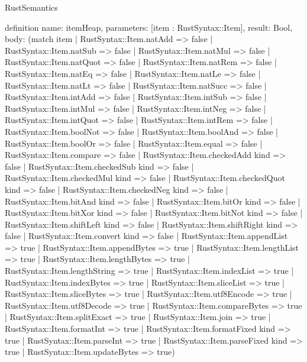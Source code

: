 \begin{lexlean}{RustSemantics}
\begin{semanticmodule}
definition{
  name: itemHeap,
  parameters: [item : RustSyntax::Item],
  result: Bool,
  body: (match item
    | RustSyntax::Item.natAdd => false
    | RustSyntax::Item.natSub => false
    | RustSyntax::Item.natMul => false
    | RustSyntax::Item.natQuot => false
    | RustSyntax::Item.natRem => false
    | RustSyntax::Item.natEq => false
    | RustSyntax::Item.natLe => false
    | RustSyntax::Item.natLt => false
    | RustSyntax::Item.natSucc => false
    | RustSyntax::Item.intAdd => false
    | RustSyntax::Item.intSub => false
    | RustSyntax::Item.intMul => false
    | RustSyntax::Item.intNeg => false
    | RustSyntax::Item.intQuot => false
    | RustSyntax::Item.intRem => false
    | RustSyntax::Item.boolNot => false
    | RustSyntax::Item.boolAnd => false
    | RustSyntax::Item.boolOr => false
    | RustSyntax::Item.equal => false
    | RustSyntax::Item.compare => false
    | RustSyntax::Item.checkedAdd kind => false
    | RustSyntax::Item.checkedSub kind => false
    | RustSyntax::Item.checkedMul kind => false
    | RustSyntax::Item.checkedQuot kind => false
    | RustSyntax::Item.checkedNeg kind => false
    | RustSyntax::Item.bitAnd kind => false
    | RustSyntax::Item.bitOr kind => false
    | RustSyntax::Item.bitXor kind => false
    | RustSyntax::Item.bitNot kind => false
    | RustSyntax::Item.shiftLeft kind => false
    | RustSyntax::Item.shiftRight kind => false
    | RustSyntax::Item.convert kind => false
    | RustSyntax::Item.appendList => true
    | RustSyntax::Item.appendBytes => true
    | RustSyntax::Item.lengthList => true
    | RustSyntax::Item.lengthBytes => true
    | RustSyntax::Item.lengthString => true
    | RustSyntax::Item.indexList => true
    | RustSyntax::Item.indexBytes => true
    | RustSyntax::Item.sliceList => true
    | RustSyntax::Item.sliceBytes => true
    | RustSyntax::Item.utf8Encode => true
    | RustSyntax::Item.utf8Decode => true
    | RustSyntax::Item.compareBytes => true
    | RustSyntax::Item.splitExact => true
    | RustSyntax::Item.join => true
    | RustSyntax::Item.formatInt => true
    | RustSyntax::Item.formatFixed kind => true
    | RustSyntax::Item.parseInt => true
    | RustSyntax::Item.parseFixed kind => true
    | RustSyntax::Item.updateBytes => true)
}


\end{semanticmodule}
\end{lexlean}

